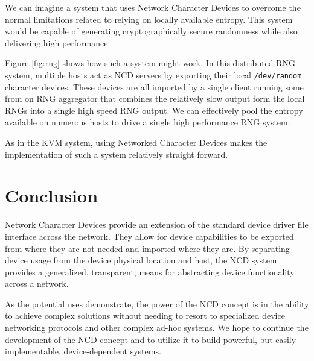 \documentclass[11pt,twocolumn]{article}
\begin{document}
We can imagine a system that uses Network Character Devices to overcome
the normal limitations related to relying on locally available entropy. This
system would be capable of generating cryptographically secure
randomness while also delivering high performance.

Figure \ref{fig:rng} shows how such a system might work. In this
distributed RNG system, multiple hosts act as NCD servers by exporting
their local \texttt{/dev/random} character devices. These devices are
all imported by a single client running some from on RNG aggregator
that combines the relatively slow output form the local RNGs into a
single high speed RNG output. We can effectively pool the entropy
available on numerous hosts to drive a single high performance RNG
system.

As in the KVM system, using Networked Character Devices makes the
implementation of such a system relatively straight forward.

\section{Conclusion}
\label{sec:conclusion}

Network Character Devices provide an extension of the standard device
driver file interface across the network. They allow for device
capabilities to be exported from where they are not needed and imported
where they are. By separating device usage from the device physical
location and host, the NCD system provides a generalized, transparent,
means for abstracting device functionality across a network.

As the potential uses demonstrate, the power of
the NCD concept is in the ability to achieve complex solutions without
needing to resort to specialized device networking protocols and other
complex ad-hoc systems. We hope to continue the development of the NCD
concept and to utilize it to build powerful, but easily implementable,
device-dependent systems.

\nocite{*}

\end{document}
